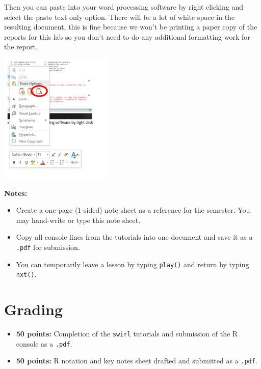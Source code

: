\documentclass{article}
\begin{document}
Then you can paste into your word processing software by right clicking and select the paste text only option.  There will be a lot of white space in the resulting document, this is fine because we won’t be printing a paper copy of the reports for this lab so you don’t need to do any additional formatting work for the report. 
\begin{center}
    \includegraphics[width=0.4\textwidth]{3611_p6.png}
\end{center}

\newpage
\textbf{Notes:}
\begin{itemize}
    \item Create a one-page (1-sided) note sheet as a reference for the semester. You may hand-write or type this note sheet.
    \item Copy all console lines from the tutorials into one document and save it as a \texttt{.pdf} for submission.
    \item You can temporarily leave a lesson by typing \texttt{play()} and return by typing \texttt{nxt()}.
\end{itemize}
\section*{Grading}
\begin{itemize}
    \item \textbf{50 points:} Completion of the \texttt{swirl} tutorials and submission of the R console as a \texttt{.pdf}.
    \item \textbf{50 points:} R notation and key notes sheet drafted and submitted as a \texttt{.pdf}.
\end{itemize}
\end{document}
